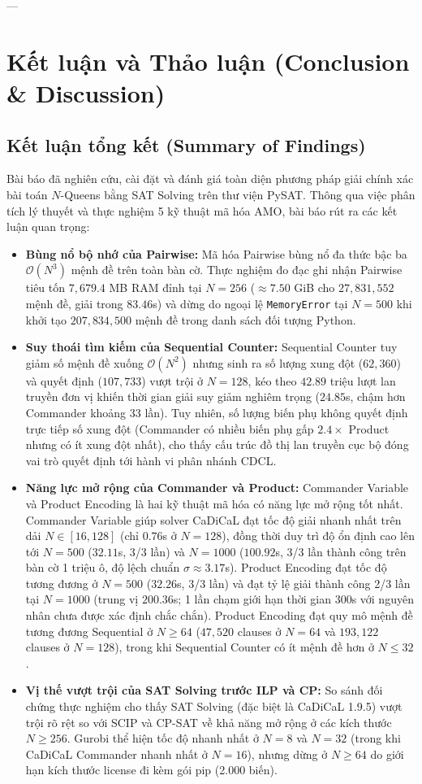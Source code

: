 \documentclass[a4paper,fleqn]{cas-sc}
\begin{document}
---

\section{Kết luận và Thảo luận (Conclusion \& Discussion)}

\subsection{Kết luận tổng kết (Summary of Findings)}
Bài báo đã nghiên cứu, cài đặt và đánh giá toàn diện phương pháp giải chính xác bài toán $N$-Queens bằng SAT Solving trên thư viện PySAT. Thông qua việc phân tích lý thuyết và thực nghiệm 5 kỹ thuật mã hóa AMO, bài báo rút ra các kết luận quan trọng:
\begin{itemize}
    \item \textbf{Bùng nổ bộ nhớ của Pairwise:} Mã hóa Pairwise bùng nổ đa thức bậc ba $\mathcal{O}(N^3)$ mệnh đề trên toàn bàn cờ. Thực nghiệm đo đạc ghi nhận Pairwise tiêu tốn $7{,}679.4$ MB RAM đỉnh tại $N=256$ ($\approx 7.50$ GiB cho $27{,}831{,}552$ mệnh đề, giải trong $83.46$s) và dừng do ngoại lệ \texttt{MemoryError} tại $N=500$ khi khởi tạo $207{,}834{,}500$ mệnh đề trong danh sách đối tượng Python.
    \item \textbf{Suy thoái tìm kiếm của Sequential Counter:} Sequential Counter tuy giảm số mệnh đề xuống $\mathcal{O}(N^2)$ nhưng sinh ra số lượng xung đột ($62{,}360$) và quyết định ($107{,}733$) vượt trội ở $N=128$, kéo theo $42.89$ triệu lượt lan truyền đơn vị khiến thời gian giải suy giảm nghiêm trọng ($24.85$s, chậm hơn Commander khoảng 33 lần). Tuy nhiên, số lượng biến phụ không quyết định trực tiếp số xung đột (Commander có nhiều biến phụ gấp $2.4\times$ Product nhưng có ít xung đột nhất), cho thấy cấu trúc đồ thị lan truyền cục bộ đóng vai trò quyết định tới hành vi phân nhánh CDCL.
    \item \textbf{Năng lực mở rộng của Commander và Product:} Commander Variable và Product Encoding là hai kỹ thuật mã hóa có năng lực mở rộng tốt nhất. Commander Variable giúp solver CaDiCaL đạt tốc độ giải nhanh nhất trên dải $N \in [16, 128]$ (chỉ $0.76$s ở $N=128$), đồng thời duy trì độ ổn định cao lên tới $N=500$ ($32.11$s, 3/3 lần) và $N=1000$ ($100.92$s, 3/3 lần thành công trên bàn cờ 1 triệu ô, độ lệch chuẩn $\sigma \approx 3.17$s). Product Encoding đạt tốc độ tương đương ở $N=500$ ($32.26$s, 3/3 lần) và đạt tỷ lệ giải thành công 2/3 lần tại $N=1000$ (trung vị $200.36$s; 1 lần chạm giới hạn thời gian 300s với nguyên nhân chưa được xác định chắc chắn). Product Encoding đạt quy mô mệnh đề tương đương Sequential ở $N \ge 64$ ($47{,}520$ clauses ở $N=64$ và $193{,}122$ clauses ở $N=128$), trong khi Sequential Counter có ít mệnh đề hơn ở $N \le 32$.
    \item \textbf{Vị thế vượt trội của SAT Solving trước ILP và CP:} So sánh đối chứng thực nghiệm cho thấy SAT Solving (đặc biệt là CaDiCaL 1.9.5) vượt trội rõ rệt so với SCIP và CP-SAT về khả năng mở rộng ở các kích thước $N \ge 256$. Gurobi thể hiện tốc độ nhanh nhất ở $N = 8$ và $N = 32$ (trong khi CaDiCaL Commander nhanh nhất ở $N = 16$), nhưng dừng ở $N \ge 64$ do giới hạn kích thước license đi kèm gói pip (2.000 biến).
\end{itemize}
\end{document}
